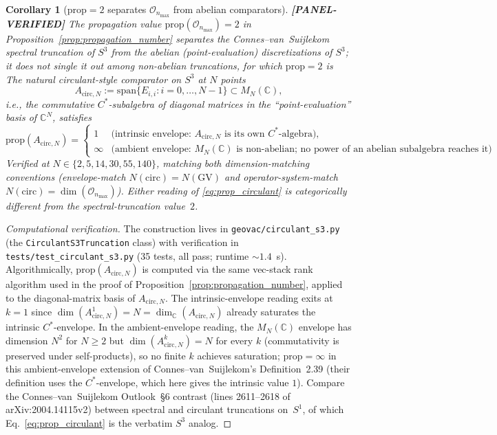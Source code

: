 \documentclass[11pt]{article}
\newtheorem{corollary}{Corollary}
\begin{document}
\begin{corollary}[$\mathrm{prop} = 2$ separates $\mathcal{O}_{n_{\max}}$ from abelian comparators]
\label{cor:structural_specificity}
\textbf{[PANEL-VERIFIED]} The propagation value
$\mathrm{prop}(\mathcal{O}_{n_{\max}}) = 2$ in
Proposition~\ref{prop:propagation_number} separates the
Connes--van~Suijlekom spectral truncation of $S^3$ from the abelian
(point-evaluation) discretizations of $S^3$; it does \emph{not} single
it out among non-abelian truncations, for which $\mathrm{prop} = 2$ is
The natural circulant-style comparator on $S^3$ at $N$ points
\[
   A_{\mathrm{circ}, N} := \mathrm{span}\{E_{i, i} : i = 0, \ldots, N - 1\}
   \subset M_N(\mathbb{C}),
\]
i.e., the commutative $C^*$-subalgebra of diagonal matrices in the
``point-evaluation'' basis of $\mathbb{C}^N$, satisfies
\begin{equation}
   \mathrm{prop}(A_{\mathrm{circ}, N}) = \begin{cases}
      1 & \text{(intrinsic envelope:\ $A_{\mathrm{circ}, N}$ is its own
                  $C^*$-algebra)}, \\
      \infty & \text{(ambient envelope:\ $M_N(\mathbb{C})$ is non-abelian;
                       no power of an abelian subalgebra reaches it)}.
   \end{cases}
   \label{eq:prop_circulant}
\end{equation}
Verified at $N \in \{2, 5, 14, 30, 55, 140\}$, matching both
dimension-matching conventions (envelope-match $N(\mathrm{circ}) =
N(\mathrm{GV})$ and operator-system-match $N(\mathrm{circ}) =
\dim(\mathcal{O}_{n_{\max}})$).  Either reading of
\eqref{eq:prop_circulant} is categorically different from the
spectral-truncation value~$2$.
\end{corollary}

\begin{proof}[Computational verification]
The construction lives in \texttt{geovac/circulant\_s3.py} (the
\texttt{CirculantS3Truncation} class) with verification in
\texttt{tests/test\_circulant\_s3.py} (35 tests, all pass; runtime
${\sim}1.4$~s).  Algorithmically, $\mathrm{prop}(A_{\mathrm{circ}, N})$
is computed via the same vec-stack rank algorithm used in the
proof of Proposition~\ref{prop:propagation_number}, applied to the
diagonal-matrix basis of $A_{\mathrm{circ}, N}$.  The intrinsic-envelope
reading exits at $k = 1$ since $\dim(A_{\mathrm{circ}, N}^1) = N =
\dim_{\mathbb{C}}(A_{\mathrm{circ}, N})$ already saturates the
intrinsic $C^*$-envelope.  In the ambient-envelope reading, the
$M_N(\mathbb{C})$ envelope has dimension $N^2$ for $N \ge 2$ but
$\dim(A_{\mathrm{circ}, N}^k) = N$ for every $k$ (commutativity is
preserved under self-products), so no finite $k$ achieves
saturation; $\mathrm{prop} = \infty$ in this ambient-envelope
extension of Connes--van~Suijlekom's Definition~2.39 (their definition
uses the $C^*$-envelope, which here gives the intrinsic value $1$).  Compare the Connes--van~Suijlekom Outlook~\S6 contrast (lines 2611--2618 of arXiv:2004.14115v2) between
spectral and circulant truncations on~$S^1$, of which
Eq.~\eqref{eq:prop_circulant} is the verbatim $S^3$ analog.
\end{proof}
\end{document}
